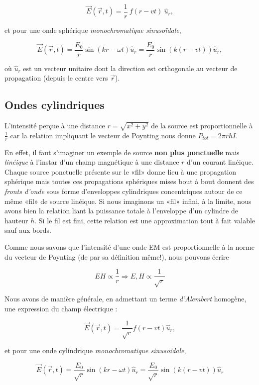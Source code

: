 \[\vec{E}(\vec{r},t) = \frac{1}{r} \:f(r-vt) \:\hat{u}_{r},\] 

et pour une onde sphérique \textit{monochromatique sinusoïdale},

\[\vec{E}(\vec{r},t) = \frac{E_{0}}{r} \sin(kr-\omega t) \hat{u}_{r} = \frac{E_{0}}{r} \sin(k(r- vt)) \hat{u}_{r}, \]

où $\hat{u}_{r}$ est un vecteur unitaire dont la direction est orthogonale au vecteur de propagation (depuis le centre vers $\vec{r}$).


\subsection{Ondes cylindriques} 

L'intensité perçue à une distance $r = \sqrt{x^{2} + y^{2}}$ de la source est proportionnelle à $\frac{1}{r}$ car la relation impliquant le vecteur de Poynting nous 
donne $P_{tot} = 2 \pi r h I$.

En effet, il faut s'imaginer un exemple de source \textbf{non plus ponctuelle} mais \textit{linéique} à l'instar d'un champ magnétique à une 
distance $r$ d'un courant linéique. Chaque source ponctuelle présente sur le «fil» donne lieu à une propagation sphérique mais toutes ces propagations sphériques mises bout à bout donnent 
des \textit{fronts d'onde} sous forme d'enveloppes cylindriques concentriques autour de ce même «fil» de source linéique. Si nous imaginons un «fil» infini, à la limite,
nous avons bien la relation liant la puissance totale à l'enveloppe d'un cylindre de hauteur $h$. Si le fil est fini, cette relation est une approximation tout à fait valable sauf 
aux bords.

Comme nous savons que l'intensité d'une onde EM est proportionnelle à la norme du vecteur de Poynting (de par sa définition même!), nous pouvons écrire 

\[ EH \propto \frac{1}{r} \Rightarrow E,H \propto \frac{1}{\sqrt{r}}\]

Nous avons de manière générale, en admettant un terme \textit{d'Alembert} homogène, une expression du champ électrique : 

\[\vec{E}(\vec{r},t) = \frac{1}{\sqrt{r}} f(r-vt) \hat{u}_{r},\] 

et pour une onde cylindrique \textit{monochromatique sinusoïdale},

\[\vec{E}(\vec{r},t) = \frac{E_{0}}{\sqrt{r}} \sin(kr - \omega t) \hat{u}_{r} = \frac{E_{0}}{\sqrt{r}} \sin(k(r - v t)) \hat{u}_{r}\]

